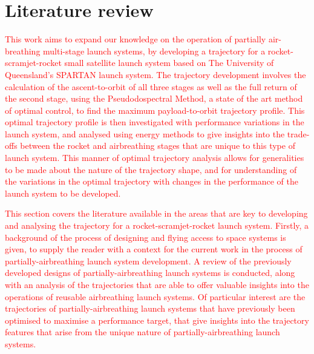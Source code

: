 
\cleardoublepage
\chapter{Literature review}\label{chapter:literature-review}

  \textcolor{red}{
This work aims to expand our knowledge on the operation of partially air-breathing multi-stage launch systems, by developing a trajectory for a rocket-scramjet-rocket small satellite launch system based on The University of Queensland's SPARTAN launch system. The trajectory development involves the calculation of the ascent-to-orbit of all three stages as well as the full return of the second stage, using the Pseudodospectral Method, a state of the art method of optimal control, to find the maximum payload-to-orbit trajectory profile. This optimal trajectory profile is then investigated with performance variations in the launch system, and analysed using energy methods to give insights into the trade-offs between the rocket and airbreathing stages that are unique to this type of launch system. This manner of optimal trajectory analysis allows for generalities to be made about the nature of the trajectory shape, and for understanding of the variations in the optimal trajectory with changes in the performance of the launch system to be developed.}

\textcolor{red}{
This section covers the literature available in the areas that are key to developing and analysing the trajectory for a rocket-scramjet-rocket launch system. Firstly, a background of the process of designing and flying access to space systems is given, to supply the reader with a context for the current work in the process of partially-airbreathing launch system development. 
A review of the previously developed designs of partially-airbreathing launch systems is conducted, along with an analysis of the trajectories that are able to offer valuable insights into the operations of reusable airbreathing launch systems. Of particular interest are the trajectories of partially-airbreathing launch systems that have previously been optimised to maximise a performance target, that give insights into the trajectory features that arise from the unique nature of partially-airbreathing launch systems. 
}
  
  
  
  
  
  

